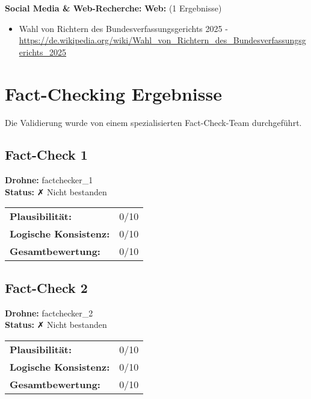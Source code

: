 \documentclass[12pt,a4paper]{article}
\begin{document}
\textbf{Social Media \& Web-Recherche:}
\textbf{Web:} (1 Ergebnisse)
\begin{itemize}
\item Wahl von Richtern des Bundesverfassungsgerichts 2025 - \url{https://de.wikipedia.org/wiki/Wahl_von_Richtern_des_Bundesverfassungsgerichts_2025}
\end{itemize}


\newpage
\section{Fact-Checking Ergebnisse}

Die Validierung wurde von einem spezialisierten Fact-Check-Team durchgeführt.


\subsection{Fact-Check 1}

\textbf{Drohne:} factchecker\_1\\
\textbf{Status:} ✗ Nicht bestanden\\

\begin{tabular}{ll}
\textbf{Plausibilität:} & 0/10 \\
\textbf{Logische Konsistenz:} & 0/10 \\
\textbf{Gesamtbewertung:} & 0/10 \\
\end{tabular}


\subsection{Fact-Check 2}

\textbf{Drohne:} factchecker\_2\\
\textbf{Status:} ✗ Nicht bestanden\\

\begin{tabular}{ll}
\textbf{Plausibilität:} & 0/10 \\
\textbf{Logische Konsistenz:} & 0/10 \\
\textbf{Gesamtbewertung:} & 0/10 \\
\end{tabular}
\end{document}
